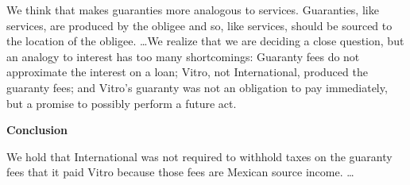 \begin{select}
We think that makes guaranties more analogous to services. Guaranties, like services, are produced by the obligee and so, like services, should be sourced to the location of the obligee. \ldots  We realize that we are deciding a close question, but an analogy to interest has too many shortcomings: Guaranty fees do not approximate the interest on a loan; Vitro, not International, produced the guaranty fees; and Vitro's guaranty was not an obligation to pay immediately, but a promise to possibly perform a future act.

\begin{center}
\textbf{Conclusion} 
\end{center}
We hold that International was not required to withhold taxes on the guaranty fees that it paid Vitro because those fees are Mexican source income. \ldots

\end{select}
		
		





